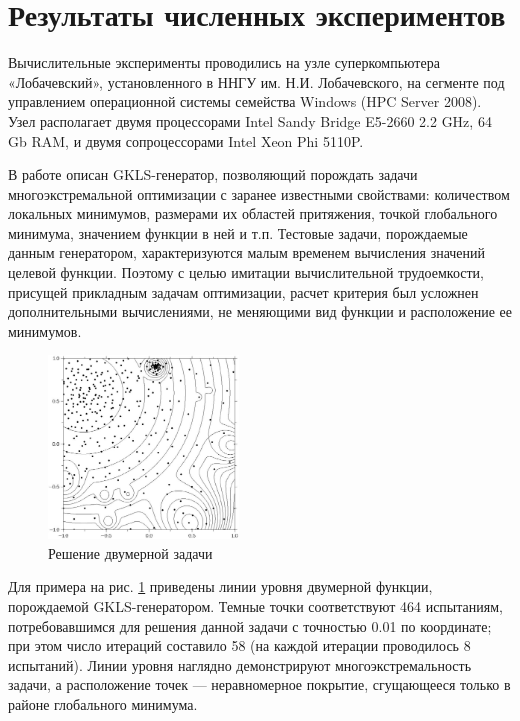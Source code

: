 \section{Результаты численных экспериментов}
Вычислительные эксперименты проводились на узле суперкомпьютера «Лобачевский», установленного в ННГУ им. Н.И. Лобачевского, на сегменте под управлением операционной системы семейства Windows (HPC Server 2008). Узел располагает двумя процессорами Intel Sandy Bridge E5-2660 2.2 GHz, 64 Gb RAM, и двумя сопроцессорами Intel Xeon Phi 5110P.
\par
В работе \cite{gklsPaper} описан GKLS-генератор, позволяющий порождать задачи многоэкстремальной оптимизации с заранее известными свойствами: количеством локальных минимумов, размерами их областей притяжения, точкой глобального минимума, значением функции в ней и т.п. Тестовые задачи, порождаемые данным генератором, характеризуются малым временем вычисления значений целевой функции. Поэтому с целью имитации вычислительной трудоемкости, присущей прикладным задачам оптимизации, расчет критерия был усложнен дополнительными вычислениями, не меняющими вид функции и расположение ее минимумов.
\begin{figure}[h!]
    \centering
		\includegraphics[width=0.45\textwidth]{isolines.eps}
		\caption{Решение двумерной задачи}\label{fig:isolines}
\end{figure}
\par
Для примера на рис. \ref{fig:isolines} приведены линии уровня двумерной функции, порождаемой GKLS-генератором. Темные точки соответствуют 464 испытаниям, потребовавшимся для решения данной задачи с точностью 0.01 по координате; при этом число итераций составило 58 (на каждой итерации проводилось 8 испытаний). Линии уровня наглядно демонстрируют многоэкстремальность задачи, а расположение точек --- неравномерное покрытие, сгущающееся только в районе глобального минимума.
\par
